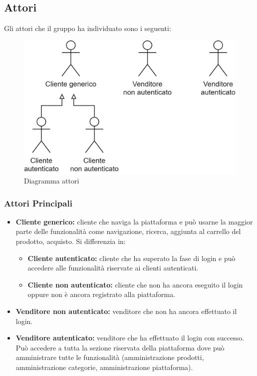 \subsection{Attori}
Gli attori che il gruppo ha individuato sono i seguenti:
\begin{figure}[H]
    \centering
    \includegraphics[width=32em]{res/images/UC/attori.png}
    \caption{Diagramma attori} 
\end{figure}
\subsubsection{Attori Principali}
\begin{itemize}
    \item \textbf{Cliente generico:} cliente che naviga la piattaforma e può usarne la maggior parte delle funzionalità come navigazione, ricerca, aggiunta al carrello del prodotto, acquisto. Si differenzia in: 
    \begin{itemize}
        \item \textbf{Cliente autenticato:} cliente che ha superato la fase di login e può accedere alle funzionalità riservate ai clienti autenticati.
        \item \textbf{Cliente non autenticato:} cliente che non ha ancora eseguito il login oppure non è ancora registrato alla piattaforma. 
    \end{itemize}
    \item \textbf{Venditore non autenticato:} venditore che non ha ancora effettuato il login.
    \item \textbf{Venditore autenticato:} venditore che ha effettuato il login con successo. Può accedere a tutta la sezione riservata della piattaforma dove può amministrare tutte le funzionalità (amministrazione prodotti, amministrazione categorie, amministrazione piattaforma).
\end{itemize}
